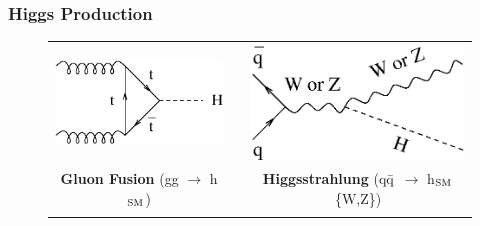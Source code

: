 \documentclass[12pt]{article}
\def\qqbar{q\={q}}
\begin{document}
\subsubsection{Higgs Production}

\begin{figure}[p]
  \begin{center}
    \begin{tabular}[t]{c p{0.5cm} c}
      \includegraphics[scale=0.5]{production_gluon_fusion.eps} & &
      \includegraphics[scale=0.5]{production_higgsstrahlung.eps} \\
      {\bf Gluon Fusion} (gg $\to$ h$_{\mbox{\scriptsize SM}}$) & &
      {\bf Higgsstrahlung} (\qqbar\ $\to$ h$_{\mbox{\scriptsize SM}}$\{W,Z\}) \\
      & \vspace{0.5cm} & \\

\end{tabular}
\end{center}
\end{figure}
\end{document}
